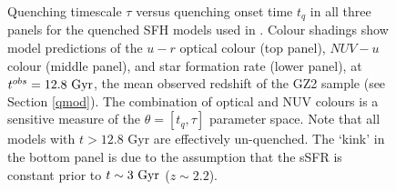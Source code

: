 \begin{figure}
\caption[Predicted colours and SFRs of quenching models]{Quenching timescale $\tau$ versus quenching onset time $t_q$ in all three panels for the quenched SFH models used in \starpy. Colour shadings show model predictions of the $u-r$ optical colour (top panel), $NUV-u$ colour (middle panel), and star formation rate (lower panel), at $t^{obs} = 12.8~\rm{Gyr}$, the mean observed redshift of the GZ2 sample (see Section \ref{qmod}). The combination of optical and NUV colours is a sensitive measure of the $\theta = [t_q, \tau]$ parameter space. Note that all models with $t > 12.8$ \rm{Gyr} are effectively un-quenched. The `kink' in the bottom panel is due to the assumption that the sSFR is constant prior to $t \sim 3~\rm{Gyr}$ ($z\sim 2.2$).}
\label{pred}
\end{figure}

